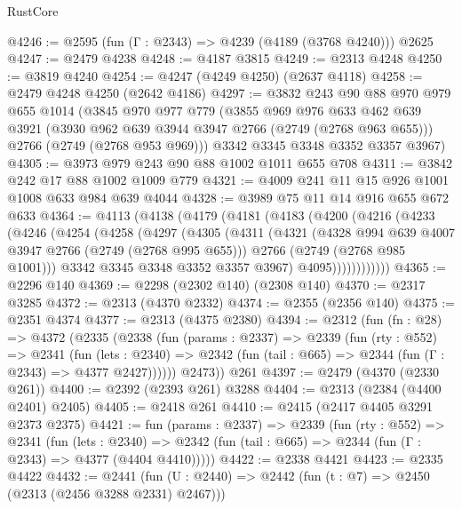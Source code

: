 \begin{lexlean}{RustCore}
\begin{coremodule}
@4246 := @2595 (fun (Γ : @2343) => @4239 (@4189 (@3768 @4240))) @2625
@4247 := @2479 @4238
@4248 := @4187 @3815
@4249 := @2313 @4248
@4250 := @3819 @4240
@4254 := @4247 (@4249 @4250) (@2637 @4118)
@4258 := @2479 @4248 @4250 (@2642 @4186)
@4297 := @3832
    @243
    @90
    @88
    @970
    @979
    @655
    @1014
    (@3845
      @970
      @977
      @779
      (@3855
        @969
        @976
        @633
        @462
        @639
        @3921
        (@3930 @962 @639 @3944 @3947 @2766 (@2749 (@2768 @963 @655)))
        @2766
        (@2749 (@2768 @953 @969)))
      @3342
      @3345
      @3348
      @3352
      @3357
      @3967)
@4305 := @3973 @979 @243 @90 @88 @1002 @1011 @655 @708
@4311 := @3842 @242 @17 @88 @1002 @1009 @779
@4321 := @4009 @241 @11 @15 @926 @1001 @1008 @633 @984 @639 @4044
@4328 := @3989 @75 @11 @14 @916 @655 @672 @633
@4364 := @4113
    (@4138
      (@4179
        (@4181
          (@4183
            (@4200
              (@4216
                (@4233
                  (@4246
                    (@4254
                      (@4258
                        (@4297
                          (@4305
                            (@4311
                              (@4321
                                (@4328 @994 @639 @4007 @3947 @2766 (@2749 (@2768 @995 @655)))
                                @2766
                                (@2749 (@2768 @985 @1001)))
                              @3342
                              @3345
                              @3348
                              @3352
                              @3357
                              @3967)
                            @4095))))))))))))
@4365 := @2296 @140
@4369 := @2298 (@2302 @140) (@2308 @140)
@4370 := @2317 @3285
@4372 := @2313 (@4370 @2332)
@4374 := @2355 (@2356 @140)
@4375 := @2351 @4374
@4377 := @2313 (@4375 @2380)
@4394 := @2312
    (fun (fn : @28) =>
    @4372
      (@2335
        (@2338
          (fun (params : @2337) =>
          @2339
            (fun (rty : @552) =>
            @2341
              (fun (lets : @2340) =>
              @2342 (fun (tail : @665) => @2344 (fun (Γ : @2343) => @4377 @2427))))))
        @2473))
    @261
@4397 := @2479 (@4370 (@2330 @261))
@4400 := @2392 (@2393 @261) @3288
@4404 := @2313 (@2384 (@4400 @2401) @2405)
@4405 := @2418 @261
@4410 := @2415 (@2417 @4405 @3291 @2373 @2375)
@4421 := fun (params : @2337) =>
  @2339
    (fun (rty : @552) =>
    @2341
      (fun (lets : @2340) =>
      @2342 (fun (tail : @665) => @2344 (fun (Γ : @2343) => @4377 (@4404 @4410)))))
@4422 := @2338 @4421
@4423 := @2335 @4422
@4432 := @2441 (fun (U : @2440) => @2442 (fun (t : @7) => @2450 (@2313 (@2456 @3288 @2331) @2467)))

\end{coremodule}
\end{lexlean}
